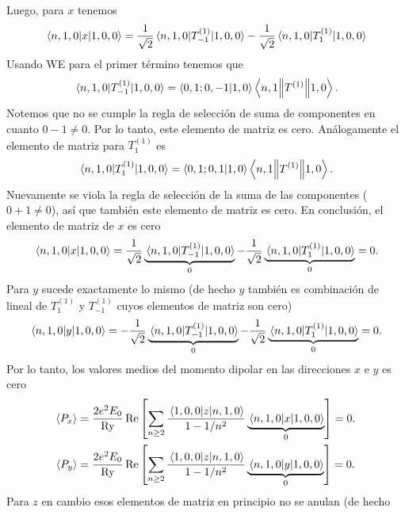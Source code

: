 \documentclass[10pt, a4paper]{article}
\newcommand{\Ry}{\ensuremath{\text{Ry}}}
\numberwithin{equation}{subsection}
\begin{document}
Luego, para $x$ tenemos
\begin{equation}
  \matrixel{n,1,0}{x}{1,0,0} =
  \frac{1}{\sqrt{2}}\matrixel{n,1,0}{T^{(1)}_{-1}}{1,0,0} -
  \frac{1}{\sqrt{2}}\matrixel{n,1,0}{T^{(1)}_{1}}{1,0,0}
\end{equation}
Usando WE para el primer término tenemos que
\begin{equation}
  \matrixel{n,1,0}{T^{(1)}_{-1}}{1,0,0} = \braket{0,1;0,-1}{1,0}
  \doublebarmel{n,1}{T^{(1)}}{1,0}.
\end{equation}
Notemos que no se cumple la regla de selección de suma de componentes en cuanto
$0 - 1 \neq 0$. Por lo tanto, este elemento de matriz es cero. Análogamente el
elemento de matriz para $T^{(1)}_{1}$ es
\begin{equation}
  \matrixel{n,1,0}{T^{(1)}_{1}}{1,0,0} = \braket{0,1;0,1}{1,0}
  \doublebarmel{n,1}{T^{(1)}}{1,0}.
\end{equation}
Nuevamente se viola la regla de selección de la suma de las componentes ($0 + 1
\neq 0$), así que también este elemento de matriz es cero. En conclusión, el
elemento de matriz de $x$ es cero
\begin{equation}
  \matrixel{n,1,0}{x}{1,0,0} =
  \frac{1}{\sqrt{2}} \underbrace{\matrixel{n,1,0}{T^{(1)}_{-1}}{1,0,0}}_{0} -
  \frac{1}{\sqrt{2}} \underbrace{\matrixel{n,1,0}{T^{(1)}_{1}}{1,0,0}}_{0} = 0.
\end{equation}
Para $y$ sucede exactamente lo mismo (de hecho $y$ también es combinación de
lineal de $T^{(1)}_{1}$ y $T^{(1)}_{-1}$ cuyos elementos de matriz son cero)
\begin{equation}
  \matrixel{n,1,0}{y}{1,0,0} = -
  \frac{1}{\sqrt{2}} \underbrace{\matrixel{n,1,0}{T^{(1)}_{-1}}{1,0,0}}_{0} -
  \frac{1}{\sqrt{2}} \underbrace{\matrixel{n,1,0}{T^{(1)}_{1}}{1,0,0}}_{0} = 0.
\end{equation}
Por lo tanto, los valores medios del momento dipolar en las direcciones $x$ e
$y$ es cero
\begin{align}
  \expval{P_x}
  &= \frac{2e^2E_0}{\Ry}\Re\left[
    \sum_{n \geq 2} \frac{\matrixel{1,0,0}{z}{n,1,0}}{1 - 1/n^2}
    \underbrace{\matrixel{n,1,0}{x}{1,0,0}}_{0}
    \right] = 0. \\
  \expval{P_y}
  &= \frac{2e^2E_0}{\Ry}\Re\left[
    \sum_{n \geq 2} \frac{\matrixel{1,0,0}{z}{n,1,0}}{1 - 1/n^2}
    \underbrace{\matrixel{n,1,0}{y}{1,0,0}}_{0}
    \right] = 0. \\
\end{align}
Para $z$ en cambio esos elementos de matriz en principio no se anulan (de hecho
\end{document}
